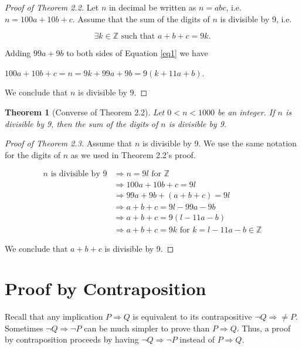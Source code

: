 \documentclass[12pt,a4paper]{article}
\newtheorem{theorem}{Theorem}[section]
\theoremstyle{definition}
\begin{document}
\begin{proof}[Proof of Theorem 2.2]
Let $n$ in decimal be written as $n=abc$, i.e. $n=100a+10b+c$. Assume that the sum of the digits of $n$ is divisible by 9, i.e.

\begin{equation}\label{eq1}
\exists k\in\mathbb{Z}\text{ such that }a+b+c=9k.
\end{equation}

Adding $99a+9b$ to both sides of Equation \eqref{eq1} we have

\begin{center}
$100a+10b+c=n=9k+99a+9b=9(k+11a+b)$.
\end{center}

We conclude that $n$ is divisible by 9.
\end{proof}

\begin{theorem}[Converse of Theorem 2.2]\label{thm2.3}
Let $0<n<1000$ be an integer. If $n$ is divisible by 9, then the sum of the digits of $n$ is divisible by 9.
\end{theorem}

\begin{proof}[Proof of Theorem 2.3]
Assume that $n$ is divisible by 9. We use the same notation for the digits of $n$ as we used in Theorem 2.2's proof.
\begin{center}
	\begin{align*}
		n \text{ is divisible by 9}&\Rightarrow n=9l \text{ for } \mathbb{Z} \\
		&\Rightarrow 100a+10b+c=9l \\
		&\Rightarrow 99a+9b+(a+b+c)=9l \\
		&\Rightarrow a+b+c=9l-99a-9b \\
		&\Rightarrow a+b+c=9(l-11a-b) \\
		&\Rightarrow a+b+c=9k \text{ for } k=l-11a-b\in\mathbb{Z}
	\end{align*}
\end{center}
We conclude that $a+b+c$ is divisible by 9.
\end{proof}

\newpage

\section*{Proof by Contraposition}

Recall that any implication $P\Rightarrow Q$ is equivalent to its contrapositive $\neg Q\Rightarrow\neq P$. Sometimes $\neg Q\Rightarrow \neg P$ can be much simpler to prove than $P\Rightarrow Q$. Thus, a proof by contraposition proceeds by having $\neg Q\Rightarrow \neg P$ instead of $P \Rightarrow Q$.
\end{document}
